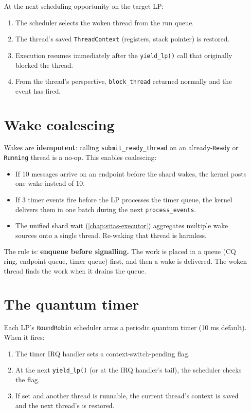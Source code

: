 At the next scheduling opportunity on the target LP:

\begin{enumerate}
    \item The scheduler selects the woken thread from the run queue.
    \item The thread's saved \texttt{ThreadContext} (registers, stack pointer)
        is restored.
    \item Execution resumes immediately after the \texttt{yield\_lp()} call that
        originally blocked the thread.
    \item From the thread's perspective, \texttt{block\_thread} returned normally
        and the event has fired.
\end{enumerate}

\section{Wake coalescing}

Wakes are \textbf{idempotent}: calling \texttt{submit\_ready\_thread} on an
already-\texttt{Ready} or \texttt{Running} thread is a no-op. This enables
coalescing:

\begin{itemize}
    \item If 10 messages arrive on an endpoint before the shard wakes, the kernel
        posts one wake instead of 10.
    \item If 3 timer events fire before the LP processes the timer queue, the
        kernel delivers them in one batch during the next \texttt{process\_events}.
    \item The unified shard wait (\autoref{chap:sitas-executor}) aggregates multiple wake sources onto
        a single thread. Re-waking that thread is harmless.
\end{itemize}

The rule is: \textbf{enqueue before signalling.} The work is placed in a queue
(CQ ring, endpoint queue, timer queue) first, and then a wake is delivered. The
woken thread finds the work when it drains the queue.

\section{The quantum timer}

Each LP's \texttt{RoundRobin} scheduler arms a periodic quantum timer (10 ms
default). When it fires:

\begin{enumerate}
    \item The timer IRQ handler sets a context-switch-pending flag.
    \item At the next \texttt{yield\_lp()} (or at the IRQ handler's tail), the
        scheduler checks the flag.
    \item If set and another thread is runnable, the current thread's context is
        saved and the next thread's is restored.
\end{enumerate}

